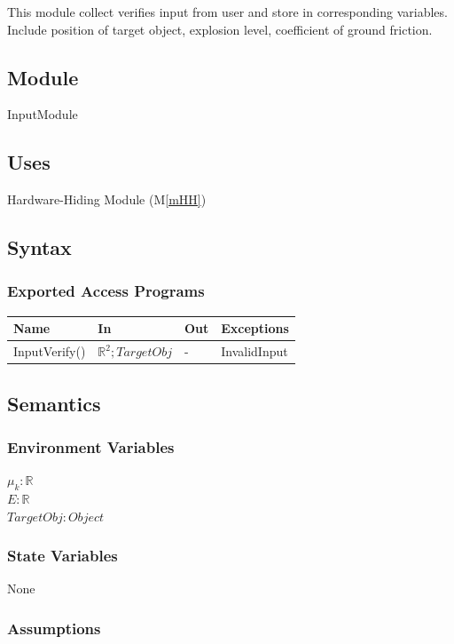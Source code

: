 \documentclass[12pt, titlepage]{article}
\newcommand{\mref}[1]{M\ref{#1}}
\begin{document}
This module collect verifies input from user and store in corresponding variables. Include position of target object, explosion level, coefficient of ground friction.

\subsection{Module}

InputModule

\subsection{Uses}

Hardware-Hiding Module (\mref{mHH})
\subsection{Syntax}

\subsubsection{Exported Access Programs}

\begin{center}
\begin{tabular}{p{3cm} p{4cm} p{4cm} p{2cm}}
\hline
\textbf{Name} & \textbf{In} & \textbf{Out} & \textbf{Exceptions} \\
\hline
InputVerify() &  $\mathbb{R}^{2}; TargetObj$ & - & InvalidInput\\
\hline
\end{tabular}
\end{center}

\subsection{Semantics}

\subsubsection{Environment Variables}

$\mu_{k}: \mathbb{R}$\\
$E: \mathbb{R}$\\
$TargetObj: Object$
\subsubsection{State Variables}
None
\subsubsection{Assumptions}
\end{document}
